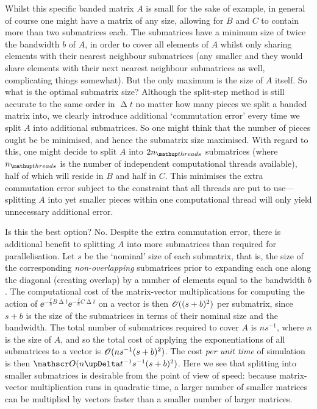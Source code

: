 Whilst this specific banded matrix $A$ is small for the sake of example, in general of course one might have a matrix of any size, allowing for $B$ and $C$ to contain more than two submatrices each. The submatrices have a minimum size of twice the bandwidth $b$ of $A$, in order to cover all elements of $A$ whilst only sharing elements with their nearest neighbour submatrices (any smaller and they would share elements with their next nearest neighbour submatrices as well, complicating things somewhat). But the only maximum is the size of $A$ itself. So what is the optimal submatrix size? Although the split-step method is still accurate to the same order in $\upDelta t$ no matter how many pieces we split a banded matrix into, we clearly introduce additional `commutation error' every time we split $A$ into additional submatrices. So one might think that the number of pieces ought be be minimised, and hence the submatrix size maximised. With regard to this, one might decide to split $A$ into $2n_\up{threads}$ submatrices (where $n_\up{threads}$ is the number of independent computational threads available), half of which will reside in $B$ and half in $C$. This minimises the extra commutation error subject to the constraint that all threads are put to use---splitting $A$ into yet smaller pieces within one computational thread will only yield unnecessary additional error.

Is this the best option? No. Despite the extra commutation error, there is additional benefit to splitting $A$ into more submatrices than required for parallelisation. Let $s$ be the `nominal' size of each submatrix, that is, the size of the corresponding \emph{non-overlapping} submatrices prior to expanding each one along the diagonal (creating overlap) by a number of elements equal to the bandwidth $b$. The computational cost of the matrix-vector multiplications for computing the action of $\ee^{-\frac\ii\hbar B\upDelta t}\ee^{-\frac\ii\hbar C\upDelta t}$ on a vector is then $\mathscr{O}((s+b)^2)$ per submatrix, since $s+b$ is the size of the submatrices in terms of their nominal size and the bandwidth. The total number of submatrices required to cover $A$ is $ns^{-1}$, where $n$ is the size of $A$, and so the total cost of applying the exponentiations of all submatrices to a vector is $\mathscr{O}(ns^{-1}(s+b)^2)$. The cost \emph{per unit time} of simulation is then $\Ord{n\upDelta t^{-1}s^{-1}(s+b)^2}$. Here we see that splitting into smaller submatrices is desirable from the point of view of speed: because matrix-vector multiplication runs in quadratic time, a larger number of smaller matrices can be multiplied by vectors faster than a smaller number of larger matrices.

